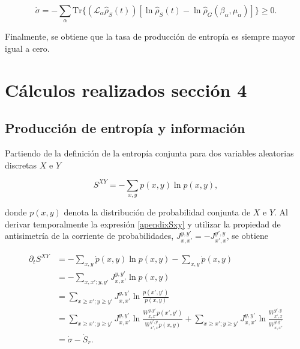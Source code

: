 \begin{appendixs}
\begin{equation*}
    \dot{\sigma} = - \sum_{\alpha} \text{Tr}\{(\mathcal{L}_{\alpha}\hat{\rho}_{S}(t)) [\ln \hat{\rho}_{S}(t) -\ln \hat{\rho}_{G}(\beta_{\alpha},\mu_{\alpha}) ] \} \geq 0.
\end{equation*}

Finalmente, se obtiene que la tasa de producción de entropía es siempre mayor igual a cero.

\label{apendix:thermolaws}

\newpage 

    \section{Cálculos realizados sección 4}
    \subsection{Producción de entropía y información}
    Partiendo de la definición de la entropía conjunta para dos variables aleatorias discretas \( X \) e \( Y \)

\begin{equation}
    S^{XY} = - \sum_{x,y} p(x,y) \ln p(x,y),
    \label{apendixSxy}
\end{equation}

donde \( p(x,y) \) denota la distribución de probabilidad conjunta de \( X \) e \( Y \). Al derivar temporalmente la expresión \ref{apendixSxy} y utilizar la propiedad de antisimetría de la corriente de probabilidades, \( J_{x,x'}^{y,y'} = - J_{x',x}^{y',y} \), se obtiene


    \begin{align*}
        \partial_{t}S^{XY} & = - \sum_{x,y} \dot{p}(x,y) \ln p(x,y) - \sum_{x,y} \dot{p}(x,y) \\
                           & = - \sum_{x,x';y,y'} J_{x,x'}^{y,y'} \ln p(x,y)  \\
                           & = \sum_{x \geq x'; y\geq y'} J_{x,x'}^{y,y'} \ln \frac{p(x',y')}{p(x,y)} \\
                           & = \sum_{x \geq x'; y\geq y'} J_{x,x'}^{y,y'} \ln \frac{W_{x,x'}^{y,y'} p(x',y')}{W_{x',x}^{y',y} p(x,y)} +  \sum_{x \geq x'; y\geq y'} J_{x,x'}^{y,y'} \ln \frac{W_{x',x}^{y',y} }{W_{x,x'}^{y,y'} } \\
                           & = \dot{\sigma} - \dot{S}_{r}.
    \end{align*}


\end{appendixs}
